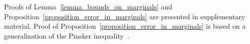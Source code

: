Proofs of Lemma~\ref{lemma_bounds_on_marginals} and Proposition~\ref{proposition_error_in_marginals} are presented in supplementary material. 
Proof of Proposition~\ref{proposition_error_in_marginals} is based on a generalization of the Pinsker inequality~\cite{altschulernips17,khalilabid2018}.

